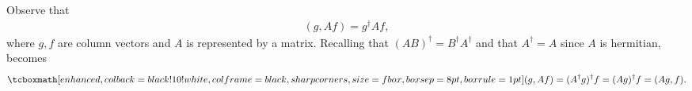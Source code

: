 
Observe that
\begin{align}
    \label{eq:expand-inner-prod}
    (g,Af) = g^{\dagger}Af
,\end{align}
where $g,f$ are column vectors and $A$ is represented by a matrix.
Recalling that $(AB)^{\dagger} = B^{\dagger}A^{\dagger}$ and that $A^{\dagger} = A$ since $A$ is hermitian,  becomes
\begin{eqnarray}
    \label{eq:inner-prod-result}
    \eqbox{
    (g,Af) = (A^{\dagger}g)^{\dagger}f = (A g)^{\dagger} f = (Ag,f)
}
.\end{eqnarray}




